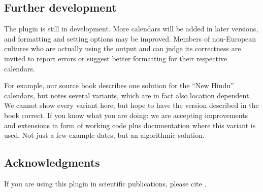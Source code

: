 \subsection{Further development}
The plugin is still in development. More calendars will be added in
later versions, and formatting and setting options may be
improved. Members of non-European cultures who are actually using the
output and can judge its correctness are invited to report errors or
suggest better formatting for their respective calendars.

For example, our source book \citep{Reingold-Dershowitz:2018}
describes one solution for the ``New Hindu'' calendars, but notes
several variants, which are in fact also location dependent. We cannot
show every variant here, but hope to have the version described in the
book correct. If you know what you are doing: we are accepting
improvements and extensions in form of working code plus documentation
where this variant is used. Not just a few example dates, but an
algorithmic solution.

\subsection{Acknowledgments}

If you are using this plugin in scientific publications, please cite \citet{Zotti-etal:JSA2020.6.2}.



